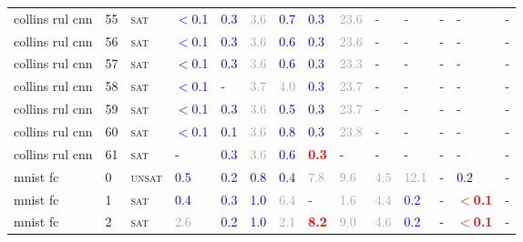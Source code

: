\begin{center}
{\begin{longtable}{@{}llllllllllllll@{}}
collins rul cnn & 55 & \textsc{sat} & \textcolor{blue}{$<$0.1} & \textcolor{blue}{0.3} & \textcolor{darkgray}{3.6} & \textcolor{blue}{0.7} & \textcolor{blue}{0.3} & \textcolor{darkgray}{23.6} & - & - & - & - & - \\
collins rul cnn & 56 & \textsc{sat} & \textcolor{blue}{$<$0.1} & \textcolor{blue}{0.3} & \textcolor{darkgray}{3.6} & \textcolor{blue}{0.6} & \textcolor{blue}{0.3} & \textcolor{darkgray}{23.6} & - & - & - & - & - \\
collins rul cnn & 57 & \textsc{sat} & \textcolor{blue}{$<$0.1} & \textcolor{blue}{0.3} & \textcolor{darkgray}{3.6} & \textcolor{blue}{0.6} & \textcolor{blue}{0.3} & \textcolor{darkgray}{23.3} & - & - & - & - & - \\
collins rul cnn & 58 & \textsc{sat} & \textcolor{blue}{$<$0.1} & - & \textcolor{darkgray}{3.7} & \textcolor{darkgray}{4.0} & \textcolor{blue}{0.3} & \textcolor{darkgray}{23.7} & - & - & - & - & - \\
collins rul cnn & 59 & \textsc{sat} & \textcolor{blue}{$<$0.1} & \textcolor{blue}{0.3} & \textcolor{darkgray}{3.6} & \textcolor{blue}{0.5} & \textcolor{blue}{0.3} & \textcolor{darkgray}{23.7} & - & - & - & - & - \\
collins rul cnn & 60 & \textsc{sat} & \textcolor{blue}{$<$0.1} & \textcolor{blue}{0.1} & \textcolor{darkgray}{3.6} & \textcolor{blue}{0.8} & \textcolor{blue}{0.3} & \textcolor{darkgray}{23.8} & - & - & - & - & - \\
collins rul cnn & 61 & \textsc{sat} & - & \textcolor{blue}{0.3} & \textcolor{darkgray}{3.6} & \textcolor{blue}{0.6} & \textbf{\textcolor{red}{0.3}} & - & - & - & - & - & - \\
mnist fc & 0 & \textsc{unsat} & \textcolor{blue}{0.5} & \textcolor{blue}{0.2} & \textcolor{blue}{0.8} & \textcolor{blue}{0.4} & \textcolor{darkgray}{7.8} & \textcolor{darkgray}{9.6} & \textcolor{darkgray}{4.5} & \textcolor{darkgray}{12.1} & - & \textcolor{blue}{0.2} & - \\
mnist fc & 1 & \textsc{sat} & \textcolor{blue}{0.4} & \textcolor{blue}{0.3} & \textcolor{blue}{1.0} & \textcolor{darkgray}{6.4} & - & \textcolor{darkgray}{1.6} & \textcolor{darkgray}{4.4} & \textcolor{blue}{0.2} & - & \textbf{\textcolor{red}{$<$0.1}} & - \\
mnist fc & 2 & \textsc{sat} & \textcolor{darkgray}{2.6} & \textcolor{blue}{0.2} & \textcolor{blue}{1.0} & \textcolor{darkgray}{2.1} & \textbf{\textcolor{red}{8.2}} & \textcolor{darkgray}{9.0} & \textcolor{darkgray}{4.6} & \textcolor{blue}{0.2} & - & \textbf{\textcolor{red}{$<$0.1}} & - \\

\end{longtable}}
\end{center}

